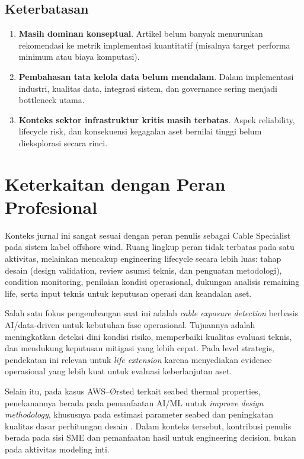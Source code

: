 \documentclass{article}
\begin{document}
\subsection*{Keterbatasan}
\begin{enumerate}
    \item \textbf{Masih dominan konseptual}. Artikel belum banyak menurunkan rekomendasi ke metrik implementasi kuantitatif (misalnya target performa minimum atau biaya komputasi).
    \item \textbf{Pembahasan tata kelola data belum mendalam}. Dalam implementasi industri, kualitas data, integrasi sistem, dan governance sering menjadi bottleneck utama.
    \item \textbf{Konteks sektor infrastruktur kritis masih terbatas}. Aspek reliability, lifecycle risk, dan konsekuensi kegagalan aset bernilai tinggi belum dieksplorasi secara rinci.
\end{enumerate}

\section*{Keterkaitan dengan Peran Profesional}
Konteks jurnal ini sangat sesuai dengan peran penulis sebagai Cable Specialist pada sistem kabel offshore wind. Ruang lingkup peran tidak terbatas pada satu aktivitas, melainkan mencakup engineering lifecycle secara lebih luas: tahap desain (design validation, review asumsi teknis, dan penguatan metodologi), condition monitoring, penilaian kondisi operasional, dukungan analisis remaining life, serta input teknis untuk keputusan operasi dan keandalan aset.

Salah satu fokus pengembangan saat ini adalah \textit{cable exposure detection} berbasis AI/data-driven untuk kebutuhan fase operasional. Tujuannya adalah meningkatkan deteksi dini kondisi risiko, memperbaiki kualitas evaluasi teknis, dan mendukung keputusan mitigasi yang lebih cepat. Pada level strategis, pendekatan ini relevan untuk \textit{life extension} karena menyediakan evidence operasional yang lebih kuat untuk evaluasi keberlanjutan aset.

Selain itu, pada kasus AWS--Ørsted terkait seabed thermal properties, penekanannya berada pada pemanfaatan AI/ML untuk \textit{improve design methodology}, khususnya pada estimasi parameter seabed dan peningkatan kualitas dasar perhitungan desain \cite{awsorsted2024seabed}. Dalam konteks tersebut, kontribusi penulis berada pada sisi SME dan pemanfaatan hasil untuk engineering decision, bukan pada aktivitas modeling inti.
\end{document}
